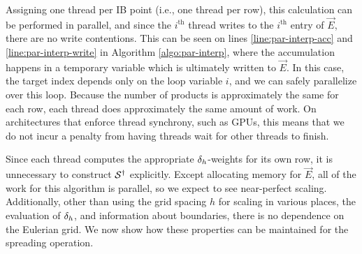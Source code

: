 Assigning one thread per IB point (i.e., one thread per row), this calculation can be
performed in parallel, and since the $i^\text{th}$ thread writes to the $i^\text{th}$
entry of $\vec{E}$, there are no write contentions. This can be seen on lines
\ref{line:par-interp-acc} and \ref{line:par-interp-write} in Algorithm
\ref{algo:par-interp}, where the accumulation happens in a temporary variable which is
ultimately written to $\vec{E}$. In this case, the target index depends only on the loop
variable $i$, and we can safely parallelize over this loop.  Because the number of
products is approximately the same for each row, each thread does approximately the same
amount of work. On architectures that enforce thread synchrony, such as GPUs, this means
that we do not incur a penalty from having threads wait for other threads to finish.

Since each thread computes the appropriate $\delta_h$-weights for its own row, it is
unnecessary to construct $\mathcal{S}^\dagger$ explicitly. Except allocating memory for $\vec{E}$,
all of the work for this algorithm is parallel, so we expect to see near-perfect scaling.
Additionally, other than using the grid spacing $h$ for scaling in various places, the
evaluation of $\delta_h$, and information about boundaries, there is no dependence on the
Eulerian grid. We now show how these properties can be maintained for the spreading
operation.

